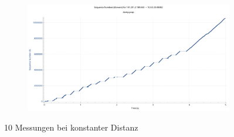 \documentclass[
    pdftex,
    12pt,
    parskip=half,
    a4paper
]{scrartcl}
\begin{document}
\begin{figure}
\begin{subfigure}{0.5\textwidth}
	\end{subfigure}
	\begin{subfigure}{0.5\textwidth}
		\includegraphics[width=1\textwidth]{../1/wireshark/constant10.pdf}
	\end{subfigure}
	\caption{10 Messungen bei konstanter Distanz}
\end{figure}
\end{document}
